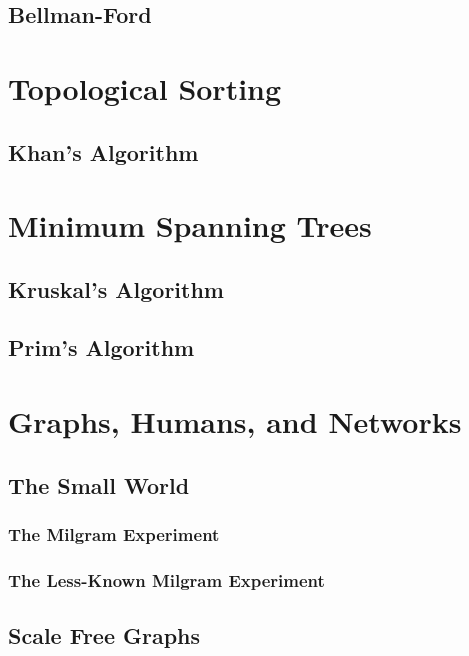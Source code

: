 \documentclass[10pt,a4paper]{book}
\begin{document}
\subsection{Bellman-Ford}



\section{Topological Sorting}

\subsection{Khan's Algorithm}

\section{Minimum Spanning Trees}


\subsection{Kruskal's Algorithm}
\subsection{Prim's Algorithm }



\section{Graphs, Humans, and Networks}

\subsection{The Small World}
\subsubsection{The Milgram Experiment}
\subsubsection{The Less-Known Milgram Experiment}

\subsection{Scale Free Graphs}
\end{document}
